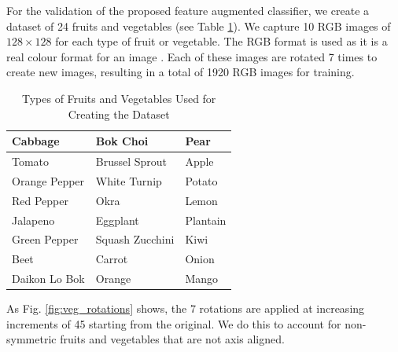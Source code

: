 For the validation of the proposed feature augmented classifier, we create a dataset of 24 fruits and vegetables (see Table \ref{tab:veg_types}). We capture 10 RGB images of $128 \times 128$ for each type of fruit or vegetable. The RGB format is used as it is a real colour format for an image \cite{b3_1}. Each of these images are rotated 7 times to create new images, resulting in a total of 1920 RGB images for training.

\bgroup
\def\arraystretch{1.5}
\begin{table}[htbp]
	\caption{Types of Fruits and Vegetables Used for Creating the Dataset}
	\begin{center}
		\begin{tabular}{| >{\centering\arraybackslash}m{2cm} | >{\centering\arraybackslash}m{2cm} | >{\centering\arraybackslash}m{2cm} |}
			\hline
			Cabbage & Bok Choi & Pear \\
			\hline
			Tomato & Brussel Sprout & Apple \\
			\hline
			Orange Pepper & White Turnip & Potato \\
			\hline
			Red Pepper & Okra & Lemon \\
			\hline
			Jalapeno & Eggplant & Plantain \\
			\hline
			Green Pepper & Squash Zucchini & Kiwi \\
			\hline
			Beet & Carrot & Onion \\
			\hline
			Daikon Lo Bok & Orange & Mango \\
			\hline
		\end{tabular}
		\label{tab:veg_types}
	\end{center}
\end{table}
\egroup

As Fig. \ref{fig:veg_rotations} shows, the 7 rotations are applied at increasing increments of 45\degree{} starting from the original. We do this to account for non-symmetric fruits and vegetables that are not axis aligned.

